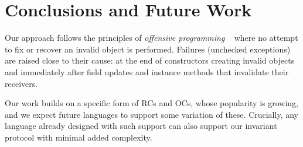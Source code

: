 
\section{Conclusions and Future Work}
\label{s:conclusion}
Our approach follows the principles of \emph{offensive programming}%
~\cite{stephens2015beginning} where
no attempt to fix or recover an invalid object is performed. 
Failures (unchecked exceptions)
		are raised close to their cause: at the end of constructors creating invalid objects and immediately after field updates and instance methods that invalidate their receivers.



Our work builds on a specific form of RCs and OCs, whose
popularity is growing, and we expect future languages to support some variation of these.
Crucially, any language already designed with such support
can also support our invariant protocol with minimal added complexity.






